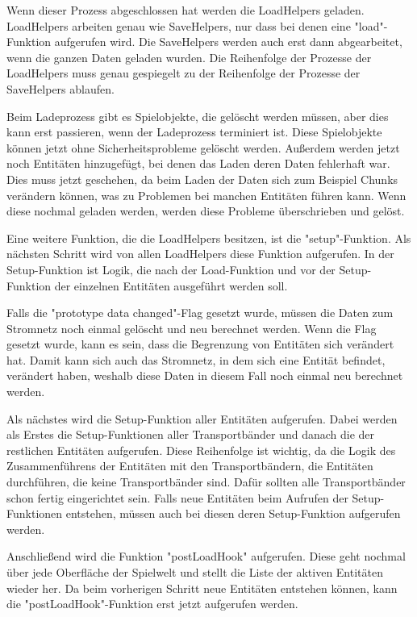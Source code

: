 Wenn dieser Prozess abgeschlossen hat werden die LoadHelpers geladen. LoadHelpers arbeiten genau wie SaveHelpers, nur dass bei denen eine "load"-Funktion aufgerufen wird. Die SaveHelpers werden auch erst dann abgearbeitet, wenn die ganzen Daten geladen wurden. Die Reihenfolge der Prozesse der LoadHelpers muss genau gespiegelt zu der Reihenfolge der Prozesse der SaveHelpers ablaufen.\cite{factorioGithubSaveLoad}

Beim Ladeprozess gibt es Spielobjekte, die gelöscht werden müssen, aber dies kann erst passieren, wenn der Ladeprozess terminiert ist. Diese Spielobjekte können jetzt ohne Sicherheitsprobleme gelöscht werden. Außerdem werden jetzt noch Entitäten hinzugefügt, bei denen das Laden deren Daten fehlerhaft war. Dies muss jetzt geschehen, da beim Laden der Daten sich zum Beispiel Chunks verändern können, was zu Problemen bei manchen Entitäten führen kann. Wenn diese nochmal geladen werden, werden diese Probleme überschrieben und gelöst.\cite{factorioGithubSaveLoad}

Eine weitere Funktion, die die LoadHelpers besitzen, ist die "setup"-Funktion. Als nächsten Schritt wird von allen LoadHelpers diese Funktion aufgerufen. In der Setup-Funktion ist Logik, die nach der Load-Funktion und vor der Setup-Funktion der einzelnen Entitäten ausgeführt werden soll.\cite{factorioGithubSaveLoad}

Falls die "prototype data changed"-Flag gesetzt wurde, müssen die Daten zum Stromnetz noch einmal gelöscht und neu berechnet werden. Wenn die Flag gesetzt wurde, kann es sein, dass die Begrenzung von Entitäten sich verändert hat. Damit kann sich auch das Stromnetz, in dem sich eine Entität befindet, verändert haben, weshalb diese Daten in diesem Fall noch einmal neu berechnet werden.\cite{factorioGithubSaveLoad}

Als nächstes wird die Setup-Funktion aller Entitäten aufgerufen. Dabei werden als Erstes die Setup-Funktionen aller Transportbänder und danach die der restlichen Entitäten aufgerufen. Diese Reihenfolge ist wichtig, da die Logik des Zusammenführens der Entitäten mit den Transportbändern, die Entitäten durchführen, die keine Transportbänder sind. Dafür sollten alle Transportbänder schon fertig eingerichtet sein. Falls neue Entitäten beim Aufrufen der Setup-Funktionen entstehen, müssen auch bei diesen deren Setup-Funktion aufgerufen werden.\cite{factorioGithubSaveLoad}

Anschließend wird die Funktion "postLoadHook" aufgerufen. Diese geht nochmal über jede Oberfläche der Spielwelt und stellt die Liste der aktiven Entitäten wieder her. Da beim vorherigen Schritt neue Entitäten entstehen können, kann die "postLoadHook"-Funktion erst jetzt aufgerufen werden.\cite{factorioGithubSaveLoad} 

